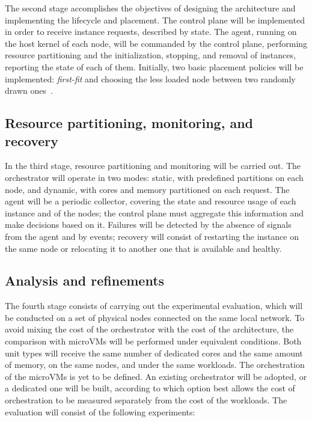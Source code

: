 \documentclass[12pt]{article}
\begin{document}
The second stage accomplishes the objectives of designing the architecture and implementing the lifecycle and placement.
The control plane will be implemented in order to receive instance requests, described by state.
The agent, running on the host kernel of each node, will be commanded by the control plane, performing resource partitioning and the initialization, stopping, and removal of
instances, reporting the state of each of them.
Initially, two basic placement policies will be implemented: \textit{first-fit} and choosing the less
loaded node between two randomly drawn ones~\cite{mitzenmacher2001power}.

\subsection{Resource partitioning, monitoring, and recovery}\label{subsec:particionamento-de-recursos-monitoramento-e-recuperacao}

In the third stage, resource partitioning and monitoring will be carried out.
The orchestrator will operate in two modes: static, with predefined partitions on each node, and dynamic, with cores and memory partitioned
on each request.
The agent will be a periodic collector, covering the state and resource usage of each
instance and of the nodes; the control plane must aggregate this information and make decisions based on it.
Failures will be detected by the absence of signals from the agent and by events; recovery will consist of restarting the instance
on the same node or relocating it to another one that is available and healthy.

\subsection{Analysis and refinements}\label{subsec:analysis-and-refinements}

The fourth stage consists of carrying out the experimental evaluation, which will be conducted on a set of physical
nodes connected on the same local network.
To avoid mixing the cost of the orchestrator with the cost of the architecture, the comparison with microVMs will be
performed under equivalent conditions.
Both unit types will receive the same number of dedicated cores and the same
amount of memory, on the same nodes, and under the same workloads.
The orchestration of the microVMs is yet to be defined.
An existing orchestrator will be adopted, or a dedicated one
will be built, according to which option best allows the cost of orchestration to be measured separately from the
cost of the workloads.
The evaluation will consist of the following experiments:
\end{document}
